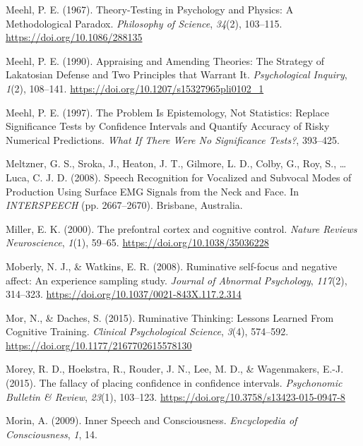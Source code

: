 \documentclass[a4paper,12pt,twoside,openright,oldfontcommands]{memoir}
\begin{document}
\leavevmode\hypertarget{ref-meehl_theory-testing_1967}{}%
Meehl, P. E. (1967). Theory-Testing in Psychology and Physics: A Methodological Paradox. \emph{Philosophy of Science}, \emph{34}(2), 103--115. \url{https://doi.org/10.1086/288135}

\leavevmode\hypertarget{ref-meehl_appraising_1990}{}%
Meehl, P. E. (1990). Appraising and Amending Theories: The Strategy of Lakatosian Defense and Two Principles that Warrant It. \emph{Psychological Inquiry}, \emph{1}(2), 108--141. \url{https://doi.org/10.1207/s15327965pli0102_1}

\leavevmode\hypertarget{ref-harlow_problem_1997}{}%
Meehl, P. E. (1997). The Problem Is Epistemology, Not Statistics: Replace Significance Tests by Confidence Intervals and Quantify Accuracy of Risky Numerical Predictions. \emph{What If There Were No Significance Tests?}, 393--425.

\leavevmode\hypertarget{ref-meltzner_speech_2008}{}%
Meltzner, G. S., Sroka, J., Heaton, J. T., Gilmore, L. D., Colby, G., Roy, S., \ldots{} Luca, C. J. D. (2008). Speech Recognition for Vocalized and Subvocal Modes of Production Using Surface EMG Signals from the Neck and Face. In \emph{INTERSPEECH} (pp. 2667--2670). Brisbane, Australia.

\leavevmode\hypertarget{ref-miller_prefontral_2000}{}%
Miller, E. K. (2000). The prefontral cortex and cognitive control. \emph{Nature Reviews Neuroscience}, \emph{1}(1), 59--65. \url{https://doi.org/10.1038/35036228}

\leavevmode\hypertarget{ref-Moberly2008}{}%
Moberly, N. J., \& Watkins, E. R. (2008). Ruminative self-focus and negative affect: An experience sampling study. \emph{Journal of Abnormal Psychology}, \emph{117}(2), 314--323. \url{https://doi.org/10.1037/0021-843X.117.2.314}

\leavevmode\hypertarget{ref-mor_ruminative_2015}{}%
Mor, N., \& Daches, S. (2015). Ruminative Thinking: Lessons Learned From Cognitive Training. \emph{Clinical Psychological Science}, \emph{3}(4), 574--592. \url{https://doi.org/10.1177/2167702615578130}

\leavevmode\hypertarget{ref-morey_fallacy_2015}{}%
Morey, R. D., Hoekstra, R., Rouder, J. N., Lee, M. D., \& Wagenmakers, E.-J. (2015). The fallacy of placing confidence in confidence intervals. \emph{Psychonomic Bulletin \& Review}, \emph{23}(1), 103--123. \url{https://doi.org/10.3758/s13423-015-0947-8}

\leavevmode\hypertarget{ref-morin_inner_2009}{}%
Morin, A. (2009). Inner Speech and Consciousness. \emph{Encyclopedia of Consciousness}, \emph{1}, 14.
\end{document}
